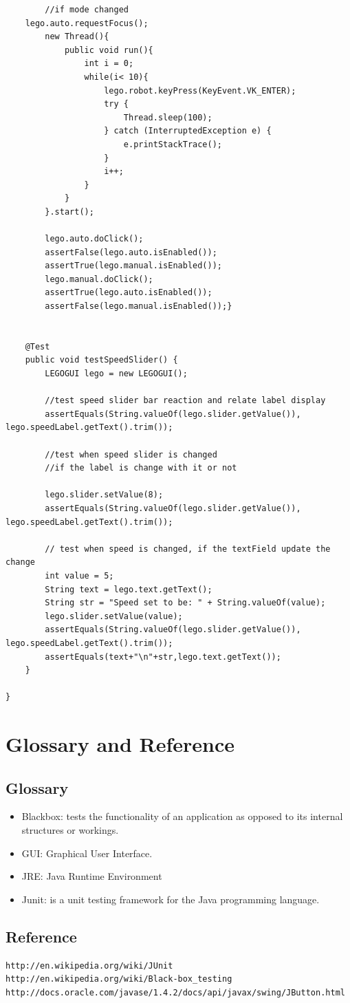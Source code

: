 \documentclass[11pt, a4paper]{report}
\begin{document}
\begin{lstlisting}
		//if mode changed 
	lego.auto.requestFocus();
		new Thread(){
        	public void run(){
        		int i = 0;
        		while(i< 10){
        			lego.robot.keyPress(KeyEvent.VK_ENTER);
					try {
						Thread.sleep(100);
					} catch (InterruptedException e) {
						e.printStackTrace();
					}
					i++;
				}
        	}    	
        }.start();

		lego.auto.doClick();
		assertFalse(lego.auto.isEnabled());
		assertTrue(lego.manual.isEnabled());
		lego.manual.doClick();
		assertTrue(lego.auto.isEnabled());
		assertFalse(lego.manual.isEnabled());}

	
	@Test
	public void testSpeedSlider() {
		LEGOGUI lego = new LEGOGUI();
		
		//test speed slider bar reaction and relate label display
		assertEquals(String.valueOf(lego.slider.getValue()), lego.speedLabel.getText().trim());
		
		//test when speed slider is changed
		//if the label is change with it or not
		
		lego.slider.setValue(8);
		assertEquals(String.valueOf(lego.slider.getValue()), lego.speedLabel.getText().trim());
		
		// test when speed is changed, if the textField update the change
		int value = 5;
		String text = lego.text.getText();
		String str = "Speed set to be: " + String.valueOf(value);
		lego.slider.setValue(value);
		assertEquals(String.valueOf(lego.slider.getValue()), lego.speedLabel.getText().trim());
		assertEquals(text+"\n"+str,lego.text.getText());
	}

}
\end{lstlisting}
\chapter{Glossary and Reference}
\section{Glossary}
\begin{itemize}
\item Blackbox: tests the functionality of an application as opposed to its internal structures or workings.
\item GUI: Graphical User Interface.
\item JRE: Java Runtime Environment
\item Junit: is a unit testing framework for the Java programming language.
\end{itemize}
\section{Reference}
\begin{lstlisting} 
http://en.wikipedia.org/wiki/JUnit
http://en.wikipedia.org/wiki/Black-box_testing
http://docs.oracle.com/javase/1.4.2/docs/api/javax/swing/JButton.html
\end{lstlisting} 
\end{document}
